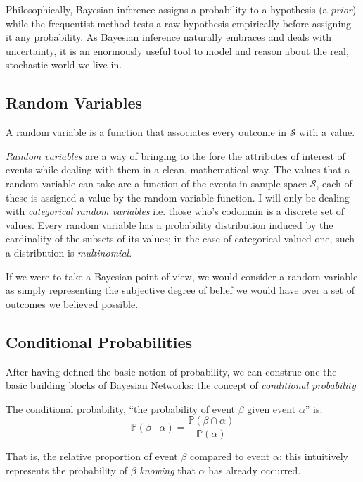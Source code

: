 Philosophically, Bayesian inference assigns a probability to a hypothesis (a \textit{prior}) while the frequentist method tests a raw hypothesis empirically before assigning it any probability.
As Bayesian inference naturally embraces and deals with uncertainty, it is an enormously useful tool to model and reason about the real, stochastic world we live in.

\subsection{Random Variables} \label{subsec:random-variables}
\begin{definition}
	A random variable is a function that associates every outcome in $\mathcal{S}$ with a value.
\end{definition}
\textit{Random variables} are a way of bringing to the fore the attributes of interest of events while dealing with them in a clean, mathematical way.
The values that a random variable can take are a function of the events in sample space $\mathcal{S}$, each of these is assigned a value by the random variable function.
I will only be dealing with \textit{categorical random variables} i.e. those who's codomain is a discrete set of values.
Every random variable has a probability distribution induced by the cardinality of the subsets of its values; in the case of categorical-valued one, such a distribution is \textit{multinomial}.

If we were to take a Bayesian point of view, we would consider a random variable as simply representing the subjective degree of belief we would have over a set of outcomes we believed possible.

\subsection{Conditional Probabilities} \label{subsec:conditional-probabilities}
After having defined the basic notion of probability, we can construe one the basic building blocks of Bayesian Networks: the concept of \textit{conditional probability} 
\begin{definition}
	The conditional probability, ``the probability of event $\beta$ given event $\alpha$'' is:
\begin{equation} \label{eq:conditionalprobability}
\mathbb{P}(\beta \mid \alpha) = \frac{\mathbb{P}(\beta \cap \alpha)}{\mathbb{P}(\alpha)}
\end{equation}
\end{definition}
That is, the relative proportion of event $\beta$ compared to event $\alpha$; this intuitively represents the probability of $\beta$ \textit{knowing} that $\alpha$ has already occurred.


